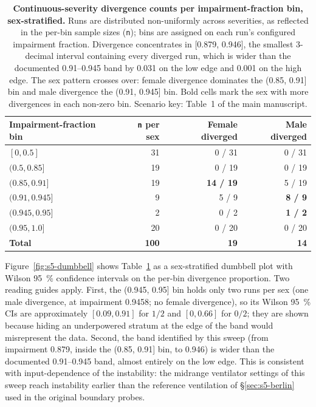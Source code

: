\documentclass[pdflatex,sn-nature]{sn-jnl}%
\begin{document}
\begin{table}[htbp]
\centering
\caption{\textbf{Continuous-severity divergence counts per impairment-fraction bin, sex-stratified.} Runs are distributed non-uniformly across severities, as reflected in the per-bin sample sizes (\texttt{n}); bins are assigned on each run's configured impairment fraction. Divergence concentrates in [0.879, 0.946], the smallest 3-decimal interval containing every diverged run, which is wider than the documented 0.91--0.945 band by 0.031 on the low edge and 0.001 on the high edge. The sex pattern crosses over: female divergence dominates the (0.85, 0.91] bin and male divergence the (0.91, 0.945] bin. Bold cells mark the sex with more divergences in each non-zero bin. Scenario key: Table~1 of the main manuscript.}
\label{tab:s5-cont}
\begin{tabular}{lrrr}
\toprule
Impairment-fraction bin & \texttt{n} per sex & Female diverged & Male diverged \\
\midrule
$[0, 0.5]$         & 31 & 0 / 31 & 0 / 31 \\
$(0.5, 0.85]$      & 19 & 0 / 19 & 0 / 19 \\
$(0.85, 0.91]$     & 19 & \textbf{14 / 19} & 5 / 19 \\
$(0.91, 0.945]$    & 9  & 5 / 9   & \textbf{8 / 9}  \\
$(0.945, 0.95]$    & 2  & 0 / 2   & \textbf{1 / 2}  \\
$(0.95, 1.0]$      & 20 & 0 / 20  & 0 / 20 \\
\midrule
\textbf{Total}     & \textbf{100} & \textbf{19} & \textbf{14} \\
\bottomrule
\end{tabular}
\end{table}

Figure~\ref{fig:s5-dumbbell} shows Table~\ref{tab:s5-cont} as a sex-stratified dumbbell plot with Wilson 95~\% confidence intervals on the per-bin divergence proportion. Two reading guides apply. First, the (0.945, 0.95] bin holds only two runs per sex (one male divergence, at impairment 0.9458; no female divergence), so its Wilson 95~\% CIs are approximately $[0.09, 0.91]$ for $1 / 2$ and $[0, 0.66]$ for $0 / 2$; they are shown because hiding an underpowered stratum at the edge of the band would misrepresent the data. Second, the band identified by this sweep (from impairment 0.879, inside the (0.85, 0.91] bin, to 0.946) is wider than the documented 0.91--0.945 band, almost entirely on the low edge. This is consistent with input-dependence of the instability: the midrange ventilator settings of this sweep reach instability earlier than the reference ventilation of \S\ref{sec:s5-berlin} used in the original boundary probes.
\end{document}
